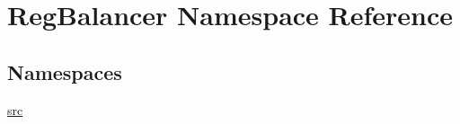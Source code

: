 \hypertarget{namespaceRegBalancer}{}\section{Reg\+Balancer Namespace Reference}
\label{namespaceRegBalancer}
\subsection*{Namespaces}
\begin{DoxyCompactItemize}
\item 
 \hyperlink{namespaceRegBalancer_1_1src}{src}
\end{DoxyCompactItemize}
